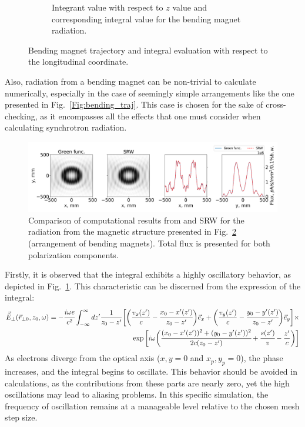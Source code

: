 \begin{figure}[h!]
\begin{subfigure}[c]{0.5\linewidth}
            \caption{Integrant value with respect to $z$ value and corresponding integral value for the bending magnet radiation.} %
            \label{Fig:bending_integral}
        \end{subfigure}
        \caption{Bending magnet trajectory and integral evaluation with respect to the longitudinal coordinate.} %
        \label{Fig:bending_magnet_figs}
    \end{figure}
    Also, radiation from a bending magnet can be non-trivial to calculate numerically, especially in the case of seemingly simple arrangements like the one presented in Fig.~\ref{Fig:bending_traj}. This case is chosen for the sake of cross-checking, as it encompasses all the effects that one must consider when calculating synchrotron radiation. 
    
    \begin{figure}[h!]
    	\centering
        \includegraphics[width=0.95\linewidth]{content/images/5_THz_Source/bend.png}
        \captionsetup{justification=centering}
        \caption{Comparison of computational results from  and SRW for the radiation from the magnetic structure presented in Fig.~\ref{Fig:bending_magnet_figs} (arrangement of bending magnets). Total flux is presented for both polarization components.}
        \label{Fig:bend}
    \end{figure}

    Firstly, it is observed that the integral exhibits a highly oscillatory behavior, as depicted in Fig.~\ref{Fig:bending_integral}. This characteristic can be discerned from the expression of the integral:
    \begin{align}
        \vec{\tilde{E}}_{\perp}(\vec{r}_{\perp 0}, z_0, \omega) = - \cfrac{i \omega e}{c^2}\int_{-\infty}^{\infty} dz' \frac{1}{z_0 - z'}
        \bigg[\bigg(\frac{v_x(z')}{c} - \cfrac{x_0 - x'(z')}{z_0 - z'}\bigg)\vec{e}_x + \bigg(\frac{v_y(z')}{c} - \cfrac{y_0 - y'(z')}{z_0 - z'}\bigg)\vec{e}_y\bigg] \times
        \cr \exp{\bigg[i\omega \bigg(\cfrac{(x_0 - x'(z'))^2 + (y_0 - y'(z'))^2}{2c(z_0 - z')} +  \cfrac{s(z')}{v} - \frac{z'}{c} \bigg)\bigg]}
        \label{Eq:free_space_Green_function_integral_simp}
    \end{align}
    As electrons diverge from the optical axis ($x, y = 0$ and $x_p, y_p = 0$), the phase increases, and the integral begins to oscillate. This behavior should be avoided in calculations, as the contributions from these parts are nearly zero, yet the high oscillations may lead to aliasing problems. In this specific simulation, the frequency of oscillation remains at a manageable level relative to the chosen mesh step size. 

